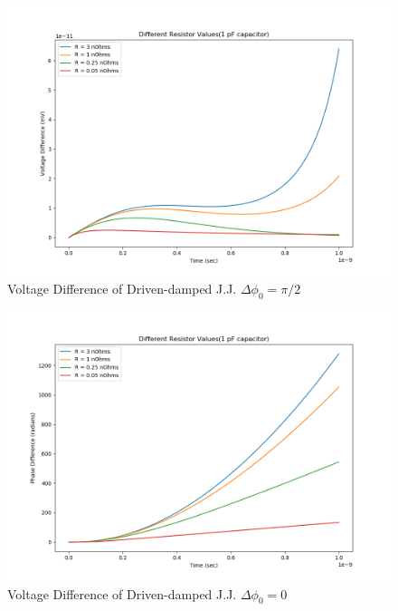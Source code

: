 \documentclass[12pt]{article}
\begin{document}
\begin{figure}
\caption{Voltage Difference of Driven-damped J.J. $\Delta \phi_0 = \pi / 2$}
\begin{center}
\includegraphics[scale=0.50]{dd-jjresv.png}
\end{center}
\end{figure}



\begin{figure}
\caption{Voltage Difference of Driven-damped J.J. $\Delta \phi_0 = 0$}
\begin{center}
\includegraphics[scale=0.50]{dd-jjresphase0.png}
\end{center}
\end{figure}
\end{document}
